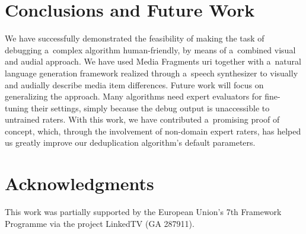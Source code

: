 \documentclass{article}
\begin{document}

\section{Conclusions and Future Work}
\label{sec:conclusions-and-future-work}
We have successfully demonstrated the feasibility of making the task of debugging a~complex algorithm human-friendly, by means of a~combined visual and audial approach. We have used Media Fragments {\sc uri} together with a~natural language generation framework realized through a~speech synthesizer to visually and audially describe media item differences. Future work will focus on generalizing the approach. Many algorithms need expert evaluators for fine-tuning their settings, simply because the debug output is unaccessible to untrained raters. With this work, we have contributed a~promising proof of concept, which, through the involvement of non-domain expert raters, has helped us greatly improve our deduplication algorithm's default parameters.


\section*{Acknowledgments}
This work was partially supported by the European Union's 7th Framework Programme via the project LinkedTV (GA 287911).


\begin{spacing}{0.934}


\end{spacing}
\end{document}
